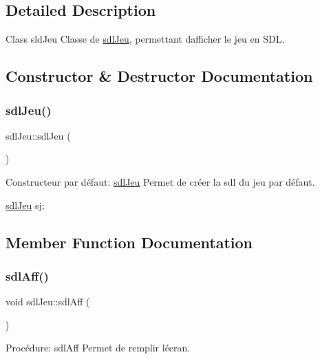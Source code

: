 \subsection{Detailed Description}
Class sld\+Jeu Classe de \hyperlink{classsdlJeu}{sdl\+Jeu}, permettant d\textquotesingle{}afficher le jeu en S\+DL. 

\subsection{Constructor \& Destructor Documentation}
\mbox{\label{classsdlJeu_a06ba2075a4b592f6d0a2e268c29a044e}} 
\subsubsection{\texorpdfstring{sdl\+Jeu()}{sdlJeu()}}
{\footnotesize\ttfamily sdl\+Jeu\+::sdl\+Jeu (\begin{DoxyParamCaption}{ }\end{DoxyParamCaption})}



Constructeur par défaut\+: \hyperlink{classsdlJeu}{sdl\+Jeu} Permet de créer la sdl du jeu par défaut. 


\begin{DoxyCode}
\hyperlink{classsdlJeu}{sdlJeu} sj;
\end{DoxyCode}
 

\subsection{Member Function Documentation}
\mbox{\label{classsdlJeu_aedada55e3f96ba37493664d358dc7b60}} 
\subsubsection{\texorpdfstring{sdl\+Aff()}{sdlAff()}}
{\footnotesize\ttfamily void sdl\+Jeu\+::sdl\+Aff (\begin{DoxyParamCaption}{ }\end{DoxyParamCaption})}



Procédure\+: sdl\+Aff Permet de remplir l\textquotesingle{}écran. 


